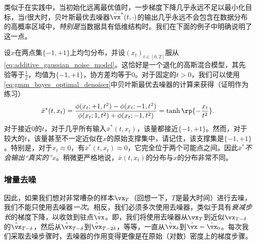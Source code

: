 \documentclass[../../book-main_zh.tex]{subfiles}
\begin{document}
类似于在实践中，当初始化远离最优值时，一步梯度下降几乎永远不足以最小化目标，当\(t\)很大时，贝叶斯最优去噪器\(\bar{\vx}^{\ast}(t, \cdot)\)的输出几乎永远不会包含在数据分布的高概率区域中，\textit{特别是}当数据具有低维结构时。我们在下面的例子中明确说明了这一点。
\begin{example}[两点混合的去噪]\label{example:denoising_twopoints}
    设\(x\)在两点集\(\{-1, +1\}\)上均匀分布，并设\((x_{t})_{t \in [0, T]}\)服从\eqref{eq:additive_gaussian_noise_model}。这恰好是一个退化的高斯混合模型，其先验等于\(\frac{1}{2}\)，均值为\(\{-1, +1\}\)，协方差均等于\(0\)。对于固定的\(t > 0\)，我们可以使用\eqref{eq:gmm_bayes_optimal_denoiser}中贝叶斯最优去噪器的计算来获得（证明作为练习）
    \begin{equation}
        \bar{x}^{\ast}(t, x_{t}) = \frac{\phi(x_{t} ; +1, t^{2}) - \phi(x_{t}
        ; -1, t^{2})}{\phi(x_{t} ; 1, t^{2}) + \phi(x_{t} ; -1,
        t^{2})} = \tanh\rp{-\frac{x_{t}}{t^{2}}}.
    \end{equation}
    对于接近\(0\)的\(t\)，对于几乎所有输入\(\bar{x}^{\ast}(t, x_{t})\)，该量都接近\(\{-1, +1\}\)。然而，对于较大的\(t\)，该量甚至不一定近似在\(x\)的原始支撑集中，请记住，该支撑集是\(\{-1, +1\}\)。特别是，对于\(x_{t} \approx 0\)，有\(\bar{x}^{\ast}(t, x_{t}) \approx 0\)，它完全位于两个可能点之间。因此\(\bar{x}^{\ast}\)\textit{不会输出“真实的”\(x\)}。稍微更严格地说，\(\bar{x}(t, x_{t})\)的分布与\(x\)的分布非常不同。
\end{example}

\subsubsection{增量去噪}
因此，如果我们想对非常嘈杂的样本\(\vx_{T}\)（回想一下，\(T\)是最大时间）进行去噪，我们不能只使用去噪器\textit{一次}。相反，我们必须多次使用去噪器，类似于具有\textit{衰减步长}的梯度下降，以收敛到驻点\(\hat{\vx}\)。即，我们将使用去噪器从\(\vx_{T}\)到近似\(\vx_{T - \delta}\)的\(\hat{\vx}_{T - \delta}\)，然后从\(\hat{\vx}_{T - \delta}\)到\(\hat{\vx}_{T - 2\delta}\)，等等，一直从\(\hat{\vx}_{\delta}\)到\(\hat{\vx} = \hat{\vx}_{0}\)。每次我们采取去噪步骤时，去噪器的作用变得更像是在原始（对数）密度上的梯度步骤。
\end{document}
